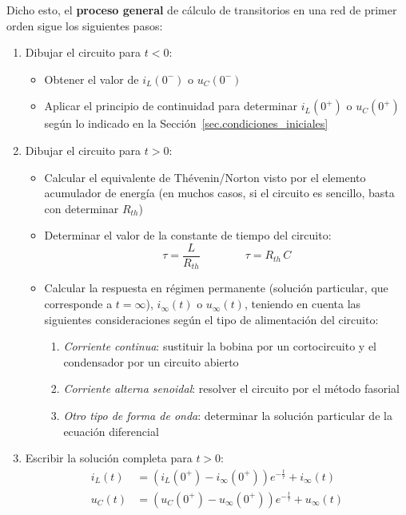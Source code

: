 Dicho esto, el \textbf{proceso general} de cálculo de transitorios en
una red de primer orden sigue los siguientes pasos:
\begin{enumerate}
\item Dibujar el circuito para $t < 0$:
  \begin{itemize}
  \item Obtener el valor de $i_L(0^-)$ o $u_C(0^-)$
  \item Aplicar el principio de continuidad para determinar $i_L(0^+)$
    o $u_C(0^+)$ según lo indicado en la
    Sección~\ref{sec.condiciones_iniciales}
  \end{itemize}
\item Dibujar el circuito para \(t > 0\):
  \begin{itemize}
  \item Calcular el equivalente de Thévenin/Norton visto por el
    elemento acumulador de energía (en muchos casos, si el circuito es
    sencillo, basta con determinar $R_{th}$)
  \item Determinar el valor de la constante de tiempo del circuito:
    \begin{equation*}
      \tau = \dfrac{L}{R_{th}} \qquad\qquad \tau = R_{th}\,{C}
    \end{equation*}
  \item Calcular la respuesta en régimen permanente (solución
    particular, que corresponde a $t=\infty$), $i_\infty(t)$ o
    $u_\infty(t)$, teniendo en cuenta las siguientes consideraciones
    según el tipo de alimentación del circuito:
    \begin{enumerate}
    \item \textit{Corriente continua}: sustituir la bobina por un
      cortocircuito y el condensador por un circuito abierto
    \item \textit{Corriente alterna senoidal}: resolver el circuito
      por el método fasorial
    \item \textit{Otro tipo de forma de onda}: determinar la solución
      particular de la ecuación diferencial
    \end{enumerate}
  \end{itemize}
\item Escribir la solución completa para $t>0$:
  \begin{align*}
    i_L(t) &= \left(i_L(0^+) - i_\infty(0^+)\right) e^{-\frac{t}{\tau}} + i_\infty(t)\\
    u_C(t) &= \left(u_C(0^+) - u_\infty(0^+)\right) e^{-\frac{t}{\tau}} + u_\infty(t)\\
  \end{align*}
\end{enumerate}
	
